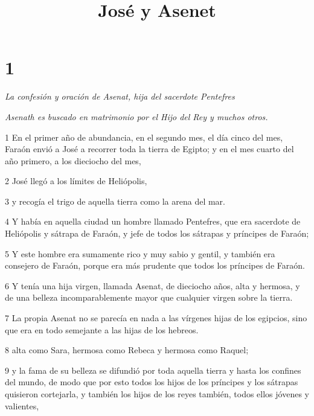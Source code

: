 


\title{José y Asenet}

\chapter{1}

\par \textit{La confesión y oración de Asenat, hija del sacerdote Pentefres}

\par \textit{Asenath es buscado en matrimonio por el Hijo del Rey y muchos otros.}

\par 1 En el primer año de abundancia, en el segundo mes, el día cinco del mes, Faraón envió a José a recorrer toda la tierra de Egipto; y en el mes cuarto del año primero, a los dieciocho del mes,

\par 2 José llegó a los límites de Heliópolis,

\par 3 y recogía el trigo de aquella tierra como la arena del mar.

\par 4 Y había en aquella ciudad un hombre llamado Pentefres, que era sacerdote de Heliópolis y sátrapa de Faraón, y jefe de todos los sátrapas y príncipes de Faraón;

\par 5 Y este hombre era sumamente rico y muy sabio y gentil, y también era consejero de Faraón, porque era más prudente que todos los príncipes de Faraón.

\par 6 Y tenía una hija virgen, llamada Asenat, de dieciocho años, alta y hermosa, y de una belleza incomparablemente mayor que cualquier virgen sobre la tierra.

\par 7 La propia Asenat no se parecía en nada a las vírgenes hijas de los egipcios, sino que era en todo semejante a las hijas de los hebreos.

\par 8 alta como Sara, hermosa como Rebeca y hermosa como Raquel;

\par 9 y la fama de su belleza se difundió por toda aquella tierra y hasta los confines del mundo, de modo que por esto todos los hijos de los príncipes y los sátrapas quisieron cortejarla, y también los hijos de los reyes también, todos ellos jóvenes y valientes,

